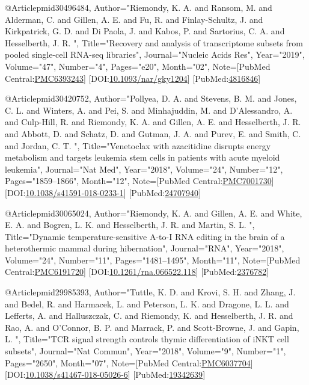 @Article{pmid30496484,
   Author="Riemondy, K. A.  and Ransom, M.  and Alderman, C.  and Gillen, A. E.  and Fu, R.  and Finlay-Schultz, J.  and Kirkpatrick, G. D.  and Di Paola, J.  and Kabos, P.  and Sartorius, C. A.  and Hesselberth, J. R. ",
   Title="{{R}ecovery and analysis of transcriptome subsets from pooled single-cell {R}{N}{A}-seq libraries}",
   Journal="Nucleic Acids Res",
   Year="2019",
   Volume="47",
   Number="4",
   Pages="e20",
   Month="02",
   Note={[PubMed Central:\href{https://www.ncbi.nlm.nih.gov/pmc/articles/PMC6393243}{PMC6393243}] [DOI:\href{https://dx.doi.org/10.1093/nar/gky1204}{10.1093/nar/gky1204}] [PubMed:\href{https://www.ncbi.nlm.nih.gov/pubmed/4816846}{4816846}] }
}

@Article{pmid30420752,
   Author="Pollyea, D. A.  and Stevens, B. M.  and Jones, C. L.  and Winters, A.  and Pei, S.  and Minhajuddin, M.  and D'Alessandro, A.  and Culp-Hill, R.  and Riemondy, K. A.  and Gillen, A. E.  and Hesselberth, J. R.  and Abbott, D.  and Schatz, D.  and Gutman, J. A.  and Purev, E.  and Smith, C.  and Jordan, C. T. ",
   Title="{{V}enetoclax with azacitidine disrupts energy metabolism and targets leukemia stem cells in patients with acute myeloid leukemia}",
   Journal="Nat Med",
   Year="2018",
   Volume="24",
   Number="12",
   Pages="1859--1866",
   Month="12",
   Note={[PubMed Central:\href{https://www.ncbi.nlm.nih.gov/pmc/articles/PMC7001730}{PMC7001730}] [DOI:\href{https://dx.doi.org/10.1038/s41591-018-0233-1}{10.1038/s41591-018-0233-1}] [PubMed:\href{https://www.ncbi.nlm.nih.gov/pubmed/24707940}{24707940}] }
}

@Article{pmid30065024,
   Author="Riemondy, K. A.  and Gillen, A. E.  and White, E. A.  and Bogren, L. K.  and Hesselberth, J. R.  and Martin, S. L. ",
   Title="{{D}ynamic temperature-sensitive {A}-to-{I} {R}{N}{A} editing in the brain of a heterothermic mammal during hibernation}",
   Journal="RNA",
   Year="2018",
   Volume="24",
   Number="11",
   Pages="1481--1495",
   Month="11",
   Note={[PubMed Central:\href{https://www.ncbi.nlm.nih.gov/pmc/articles/PMC6191720}{PMC6191720}] [DOI:\href{https://dx.doi.org/10.1261/rna.066522.118}{10.1261/rna.066522.118}] [PubMed:\href{https://www.ncbi.nlm.nih.gov/pubmed/2376782}{2376782}] }
}

@Article{pmid29985393,
   Author="Tuttle, K. D.  and Krovi, S. H.  and Zhang, J.  and Bedel, R.  and Harmacek, L.  and Peterson, L. K.  and Dragone, L. L.  and Lefferts, A.  and Halluszczak, C.  and Riemondy, K.  and Hesselberth, J. R.  and Rao, A.  and O'Connor, B. P.  and Marrack, P.  and Scott-Browne, J.  and Gapin, L. ",
   Title="{{T}{C}{R} signal strength controls thymic differentiation of i{N}{K}{T} cell subsets}",
   Journal="Nat Commun",
   Year="2018",
   Volume="9",
   Number="1",
   Pages="2650",
   Month="07",
   Note={[PubMed Central:\href{https://www.ncbi.nlm.nih.gov/pmc/articles/PMC6037704}{PMC6037704}] [DOI:\href{https://dx.doi.org/10.1038/s41467-018-05026-6}{10.1038/s41467-018-05026-6}] [PubMed:\href{https://www.ncbi.nlm.nih.gov/pubmed/19342639}{19342639}] }
}

